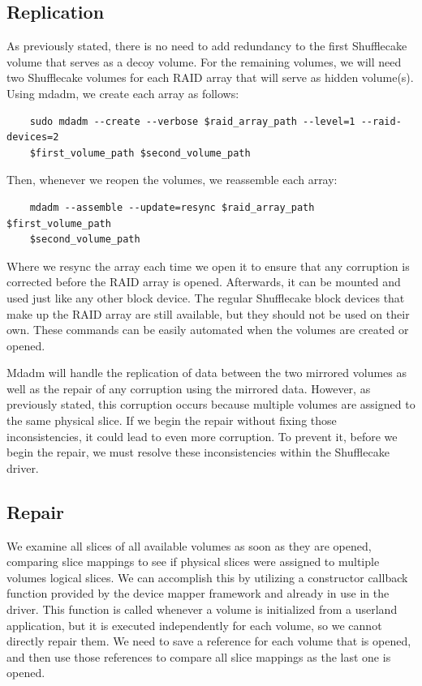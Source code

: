 \documentclass[a4paper,11pt,oneside]{report}
\begin{document}
\subsection{Replication}

As previously stated, there is no need to add redundancy to the first Shufflecake volume that serves as a decoy volume. For the remaining volumes, we will need two Shufflecake volumes for each RAID array that will serve as hidden volume(s). Using mdadm, we create each array as follows:
\begin{verbatim}
    sudo mdadm --create --verbose $raid_array_path --level=1 --raid-devices=2
    $first_volume_path $second_volume_path
\end{verbatim}
Then, whenever we reopen the volumes, we reassemble each array:
\begin{verbatim}
    mdadm --assemble --update=resync $raid_array_path $first_volume_path
    $second_volume_path
\end{verbatim}
Where we resync the array each time we open it to ensure that any corruption is corrected before the RAID array is opened. Afterwards, it can be mounted and used just like any other block device. The regular Shufflecake block devices that make up the RAID array are still available, but they should not be used on their own. These commands can be easily automated when the volumes are created or opened.

Mdadm will handle the replication of data between the two mirrored volumes as well as the repair of any corruption using the mirrored data. However, as previously stated, this corruption occurs because multiple volumes are assigned to the same physical slice. If we begin the repair without fixing those inconsistencies, it could lead to even more corruption. To prevent it, before we begin the repair, we must resolve these inconsistencies within the Shufflecake driver.

\subsection{Repair}

We examine all slices of all available volumes as soon as they are opened, comparing slice mappings to see if physical slices were assigned to multiple volumes logical slices. We can accomplish this by utilizing a constructor callback function provided by the device mapper framework and already in use in the driver. This function is called whenever a volume is initialized from a userland application, but it is executed independently for each volume, so we cannot directly repair them. We need to save a reference for each volume that is opened, and then use those references to compare all slice mappings as the last one is opened.
\end{document}
